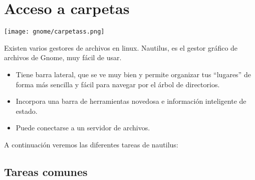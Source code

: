 \chapter{Acceso a carpetas}
\begin{center}
\texttt{[image: gnome/carpetass.png]}
\end{center}
Existen varios gestores de archivos en linux.
Nautilus, es el gestor gráfico de archivos de Gnome, muy fácil de usar.
\begin{itemize}
\item Tiene barra lateral, que se ve muy bien y permite organizar tus “lugares” de forma más sencilla y fácil para navegar por el árbol de directorios.
\item Incorpora una barra de herramientas novedosa e información inteligente de estado.
\item Puede conectarse a un servidor de archivos.
\end{itemize}
A continuación veremos las diferentes tareas de nautilus:
\section{Tareas comunes}
